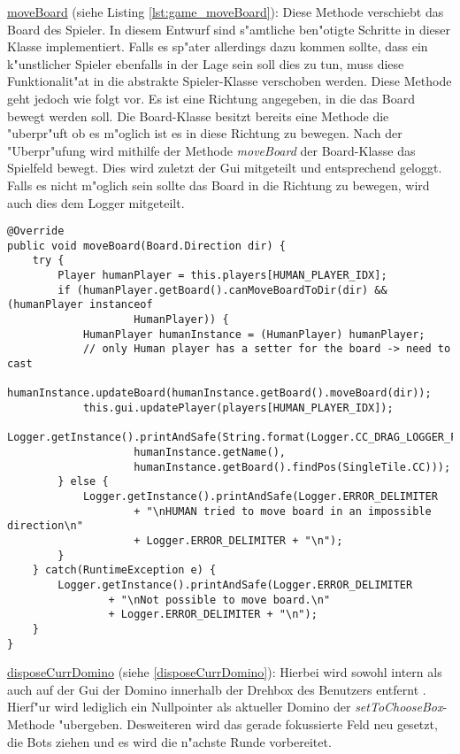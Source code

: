 \underline{moveBoard} (siehe Listing \ref{lst:game_moveBoard}): Diese Methode verschiebt das Board des Spieler. In diesem Entwurf sind s"amtliche ben"otigte Schritte in dieser Klasse implementiert. Falls es sp"ater allerdings dazu kommen sollte, dass ein k"unstlicher Spieler ebenfalls in der Lage sein soll dies zu tun, muss diese Funktionalit"at in die abstrakte Spieler-Klasse verschoben werden. Diese Methode geht jedoch wie folgt vor. Es ist eine Richtung angegeben, in die das Board bewegt werden soll. Die Board-Klasse besitzt bereits eine Methode die "uberpr"uft ob es m"oglich ist es in diese Richtung zu bewegen. Nach der "Uberpr"ufung wird mithilfe der Methode \emph{moveBoard} der Board-Klasse das Spielfeld bewegt. Dies wird zuletzt der Gui mitgeteilt und entsprechend geloggt. Falls es nicht m"oglich sein sollte das Board in die Richtung zu bewegen, wird auch dies dem Logger mitgeteilt. 

\begin{lstlisting}[float,style=CodeHighlighting,caption=Game - moveBoard,label=lst:game_moveBoard]
@Override
public void moveBoard(Board.Direction dir) {
    try {
        Player humanPlayer = this.players[HUMAN_PLAYER_IDX];
        if (humanPlayer.getBoard().canMoveBoardToDir(dir) && (humanPlayer instanceof 
        			HumanPlayer)) {
            HumanPlayer humanInstance = (HumanPlayer) humanPlayer; 
            // only Human player has a setter for the board -> need to cast
            humanInstance.updateBoard(humanInstance.getBoard().moveBoard(dir));
            this.gui.updatePlayer(players[HUMAN_PLAYER_IDX]);
            Logger.getInstance().printAndSafe(String.format(Logger.CC_DRAG_LOGGER_FORMAT,
                    humanInstance.getName(), 
                    humanInstance.getBoard().findPos(SingleTile.CC)));
        } else {
            Logger.getInstance().printAndSafe(Logger.ERROR_DELIMITER
                    + "\nHUMAN tried to move board in an impossible direction\n" 
                    + Logger.ERROR_DELIMITER + "\n");
        }
    } catch(RuntimeException e) {
        Logger.getInstance().printAndSafe(Logger.ERROR_DELIMITER 
        		+ "\nNot possible to move board.\n"
                + Logger.ERROR_DELIMITER + "\n");
    }
}
\end{lstlisting}

\underline{disposeCurrDomino} (siehe \ref{disposeCurrDomino}): Hierbei wird sowohl intern als auch auf der Gui der Domino innerhalb der Drehbox des Benutzers entfernt . Hierf"ur wird lediglich ein Nullpointer als aktueller Domino der \emph{setToChooseBox}-Methode "ubergeben. Desweiteren wird das gerade fokussierte Feld neu gesetzt, die Bots ziehen und es wird die n"achste Runde vorbereitet. 

